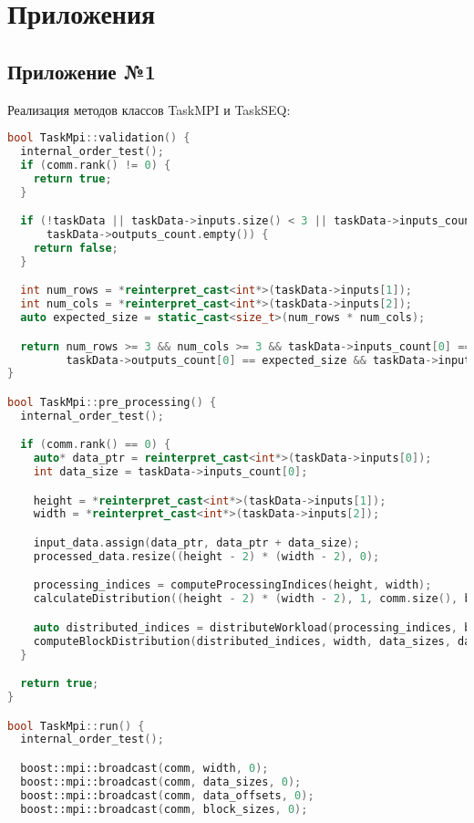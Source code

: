 \documentclass[14pt]{extarticle}
\theoremstyle{definition}
\theoremstyle{remark}
\begin{document}
\section*{Приложения}
\subsection*{Приложение №1}
\noindent Реализация методов классов TaskMPI и TaskSEQ:
\begin{lstlisting}[language=C++, caption=Приложение №1]
bool TaskMpi::validation() {
  internal_order_test();
  if (comm.rank() != 0) {
    return true;
  }

  if (!taskData || taskData->inputs.size() < 3 || taskData->inputs_count.size() < 3 || taskData->outputs.empty() ||
      taskData->outputs_count.empty()) {
    return false;
  }

  int num_rows = *reinterpret_cast<int*>(taskData->inputs[1]);
  int num_cols = *reinterpret_cast<int*>(taskData->inputs[2]);
  auto expected_size = static_cast<size_t>(num_rows * num_cols);

  return num_rows >= 3 && num_cols >= 3 && taskData->inputs_count[0] == expected_size &&
         taskData->outputs_count[0] == expected_size && taskData->inputs_count[0] == taskData->outputs_count[0];
}

bool TaskMpi::pre_processing() {
  internal_order_test();

  if (comm.rank() == 0) {
    auto* data_ptr = reinterpret_cast<int*>(taskData->inputs[0]);
    int data_size = taskData->inputs_count[0];

    height = *reinterpret_cast<int*>(taskData->inputs[1]);
    width = *reinterpret_cast<int*>(taskData->inputs[2]);

    input_data.assign(data_ptr, data_ptr + data_size);
    processed_data.resize((height - 2) * (width - 2), 0);

    processing_indices = computeProcessingIndices(height, width);
    calculateDistribution((height - 2) * (width - 2), 1, comm.size(), block_sizes, block_offsets);

    auto distributed_indices = distributeWorkload(processing_indices, block_sizes, block_offsets);
    computeBlockDistribution(distributed_indices, width, data_sizes, data_offsets);
  }

  return true;
}

bool TaskMpi::run() {
  internal_order_test();

  boost::mpi::broadcast(comm, width, 0);
  boost::mpi::broadcast(comm, data_sizes, 0);
  boost::mpi::broadcast(comm, data_offsets, 0);
  boost::mpi::broadcast(comm, block_sizes, 0);


\end{lstlisting}
\end{document}

